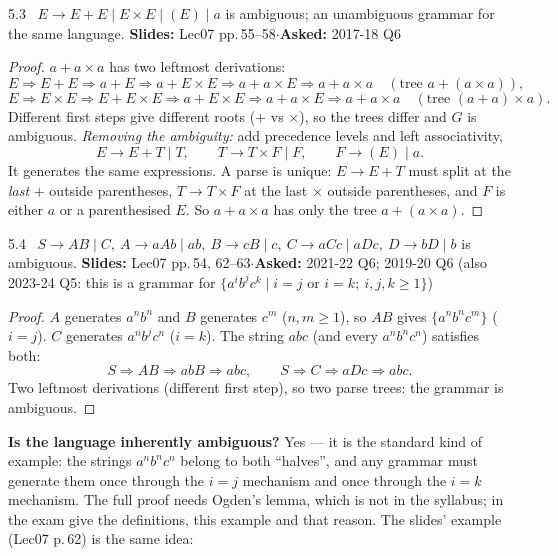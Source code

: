 \documentclass[10.5pt,a4paper]{article}
\newcommand{\src}[2]{{\footnotesize\color{gray!70!black}\textbf{Slides:} #1\enspace$\cdot$\enspace\textbf{Asked:} #2}\par}
\begin{document}
\begin{thm}{5.3 \ $E\to E+E\mid E\times E\mid(E)\mid a$ is ambiguous; an unambiguous grammar for the same language.}
\src{Lec07 pp.\,55--58}{2017-18 Q6}\end{thm}
\begin{proof}
$a+a\times a$ has two leftmost derivations:
\[E\Rightarrow E+E\Rightarrow a+E\Rightarrow a+E\times E\Rightarrow a+a\times E\Rightarrow a+a\times a\quad(\text{tree } a+(a\times a)),\]
\[E\Rightarrow E\times E\Rightarrow E+E\times E\Rightarrow a+E\times E\Rightarrow a+a\times E\Rightarrow a+a\times a\quad(\text{tree } (a+a)\times a).\]
Different first steps give different roots ($+$ vs $\times$), so the trees differ and $G$ is ambiguous.
\emph{Removing the ambiguity:} add precedence levels and left associativity,
\[E\to E+T\mid T,\qquad T\to T\times F\mid F,\qquad F\to(E)\mid a.\]
It generates the same expressions. A parse is unique: $E\to E+T$ must split at the \emph{last} $+$ outside parentheses, $T\to T\times F$ at the
last $\times$ outside parentheses, and $F$ is either $a$ or a parenthesised $E$. So $a+a\times a$ has only the tree $a+(a\times a)$.
\end{proof}

\begin{thm}{5.4 \ $S\to AB\mid C,\ A\to aAb\mid ab,\ B\to cB\mid c,\ C\to aCc\mid aDc,\ D\to bD\mid b$ is ambiguous.}
\src{Lec07 pp.\,54, 62--63}{2021-22 Q6; 2019-20 Q6 (also 2023-24 Q5: this is a grammar for $\{a^ib^jc^k\mid i=j \text{ or } i=k;\ i,j,k\ge1\}$)}\end{thm}
\begin{proof}
$A$ generates $a^nb^n$ and $B$ generates $c^m$ ($n,m\ge1$), so $AB$ gives $\{a^nb^nc^m\}$ ($i=j$). $C$ generates $a^nb^jc^n$ ($i=k$). The string
$abc$ (and every $a^nb^nc^n$) satisfies both:
\[S\Rightarrow AB\Rightarrow abB\Rightarrow abc,\qquad S\Rightarrow C\Rightarrow aDc\Rightarrow abc.\]
Two leftmost derivations (different first step), so two parse trees: the grammar is ambiguous.
\end{proof}
\textbf{Is the language inherently ambiguous?} Yes --- it is the standard kind of example: the strings $a^nb^nc^n$ belong to both ``halves'',
and any grammar must generate them once through the $i=j$ mechanism and once through the $i=k$ mechanism. The full proof needs Ogden's
lemma, which is not in the syllabus; in the exam give the definitions, this example and that reason. The slides' example (Lec07 p.\,62) is
the same idea:
\end{document}
